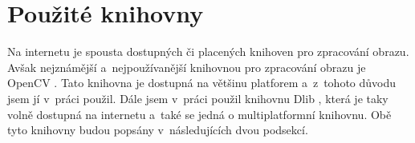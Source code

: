 \section{Použité knihovny}
Na internetu je spousta dostupných či placených knihoven pro zpracování obrazu. Avšak nejznámější a~nejpoužívanější knihovnou pro zpracování obrazu je OpenCV \cite{opencvdoc}. Tato knihovna je dostupná na většinu platforem a~z~tohoto důvodu jsem jí v~práci použil. Dále jsem v~práci použil knihovnu Dlib \cite{dlibdoc}, která je taky volně dostupná na internetu a~také se jedná o multiplatformní knihovnu. Obě tyto knihovny budou popsány v~následujících dvou podsekcí.